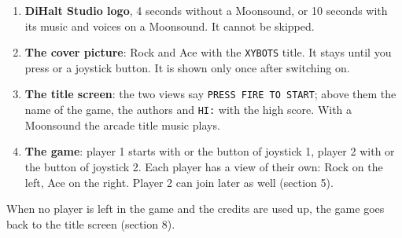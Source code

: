 \begin{enumerate}
\item \textbf{DiHalt Studio logo}, 4 seconds without a Moonsound, or 10 seconds with its music and voices on a Moonsound. It cannot be skipped.
\item \textbf{The cover picture}: Rock and Ace with the \texttt{XYBOTS} title. It stays until you press  or a joystick button. It is shown only once after switching on.
\item \textbf{The title screen}: the two views say \texttt{PRESS FIRE TO START}; above them the name of the game, the authors and \texttt{HI:} with the high score. With a Moonsound the arcade title music plays.
\item \textbf{The game}: player 1 starts with  or the button of joystick 1, player 2 with  or the button of joystick 2. Each player has a view of their own: Rock on the left, Ace on the right. Player 2 can join later as well (section 5).
\end{enumerate}
When no player is left in the game and the credits are used up, the game goes back to the title screen (section 8).

